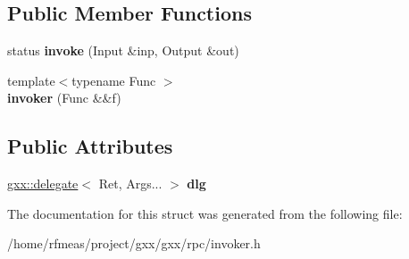 \subsection*{Public Member Functions}
\begin{DoxyCompactItemize}
\item 
status {\bfseries invoke} (Input \&inp, Output \&out)\hypertarget{structgxx_1_1rpc_1_1invoker_a50e5a0a28d7c04b91156f16a70bb972f}{}\label{structgxx_1_1rpc_1_1invoker_a50e5a0a28d7c04b91156f16a70bb972f}

\item 
{\footnotesize template$<$typename Func $>$ }\\{\bfseries invoker} (Func \&\&f)\hypertarget{structgxx_1_1rpc_1_1invoker_a14f7401bb1b445d38f743a2f8822508f}{}\label{structgxx_1_1rpc_1_1invoker_a14f7401bb1b445d38f743a2f8822508f}

\end{DoxyCompactItemize}
\subsection*{Public Attributes}
\begin{DoxyCompactItemize}
\item 
\hyperlink{classgxx_1_1delegate}{gxx\+::delegate}$<$ Ret, Args... $>$ {\bfseries dlg}\hypertarget{structgxx_1_1rpc_1_1invoker_a294a04a5da386c715cf8beedd049c3b7}{}\label{structgxx_1_1rpc_1_1invoker_a294a04a5da386c715cf8beedd049c3b7}

\end{DoxyCompactItemize}


The documentation for this struct was generated from the following file\+:\begin{DoxyCompactItemize}
\item 
/home/rfmeas/project/gxx/gxx/rpc/invoker.\+h\end{DoxyCompactItemize}

